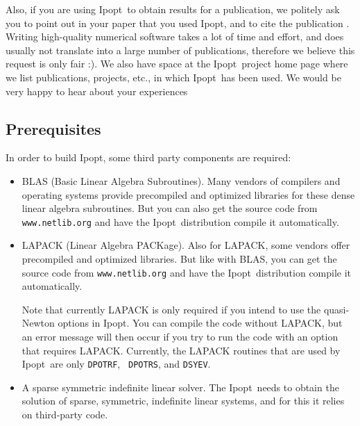 \documentclass[10pt]{article}
\newcommand{\Ipopt}{{\sc Ipopt}}
\begin{document}
Also, if you are using \Ipopt\ to obtain results for a publication, we
politely ask you to point out in your paper that you used \Ipopt, and
to cite the publication \cite{WaecBieg06:mp}.  Writing high-quality
numerical software takes a lot of time and effort, and does usually
not translate into a large number of publications, therefore we
believe this request is only fair :).  We also have space at the
\Ipopt\ project home page where we list publications, projects, etc.,
in which \Ipopt\ has been used.  We would be very happy to hear about
your experiences

\subsection{Prerequisites}
In order to build \Ipopt, some third party components are required:
\begin{itemize}
\item BLAS (Basic Linear Algebra Subroutines).  Many vendors of
  compilers and operating systems provide precompiled and optimized
  libraries for these dense linear algebra subroutines.  But you can
  also get the source code from {\tt www.netlib.org} and have the
  \Ipopt\ distribution compile it automatically.
\item LAPACK (Linear Algebra PACKage).  Also for LAPACK, some vendors
  offer precompiled and optimized libraries.  But like with BLAS, you
  can get the source code from {\tt www.netlib.org} and have the
  \Ipopt\ distribution compile it automatically.

  Note that currently LAPACK is only required if you intend to use the
  quasi-Newton options in \Ipopt.  You can compile the code without
  LAPACK, but an error message will then occur if you try to run the
  code with an option that requires LAPACK.  Currently, the LAPACK
  routines that are used by \Ipopt\ are only {\tt DPOTRF}, {\tt
    DPOTRS}, and {\tt DSYEV}.
\item A sparse symmetric indefinite linear solver. The \Ipopt\ needs
  to obtain the solution of sparse, symmetric, indefinite linear
  systems, and for this it relies on third-party code.  


\end{itemize}
\end{document}
